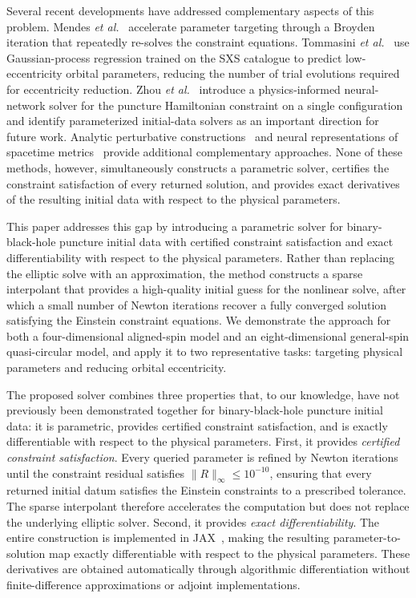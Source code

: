 \documentclass[
  aps,
  prd,
  twocolumn,
  amsmath,
  amssymb,
  nofootinbib,
  superscriptaddress,
  floatfix,
]{revtex4-2}
\begin{document}
Several recent developments have addressed complementary aspects of this problem.
Mendes \emph{et al.}~\cite{Mendes2025} accelerate parameter targeting through a Broyden iteration that repeatedly re-solves the constraint equations.
Tommasini \emph{et al.}~\cite{Tommasini2026} use Gaussian-process regression trained on the SXS catalogue to predict low-eccentricity orbital parameters, reducing the number of trial evolutions required for eccentricity reduction.
Zhou \emph{et al.}~\cite{Zhou2026} introduce a physics-informed neural-network solver for the puncture Hamiltonian constraint on a single configuration and identify parameterized initial-data solvers as an important direction for future work.
Analytic perturbative constructions~\cite{Ogurol2025} and neural representations of spacetime metrics~\cite{Cranganore2025} provide additional complementary approaches.
None of these methods, however, simultaneously constructs a parametric solver, certifies the constraint satisfaction of every returned solution, and provides exact derivatives of the resulting initial data with respect to the physical parameters.


This paper addresses this gap by introducing a parametric solver for binary-black-hole puncture initial data with certified constraint satisfaction and exact differentiability with respect to the physical parameters.
Rather than replacing the elliptic solve with an approximation, the method constructs a sparse interpolant that provides a high-quality initial guess for the nonlinear solve, after which a small number of Newton iterations recover a fully converged solution satisfying the Einstein constraint equations.
We demonstrate the approach for both a four-dimensional aligned-spin model and an eight-dimensional general-spin quasi-circular model, and apply it to two representative tasks: targeting physical parameters and reducing orbital eccentricity.


The proposed solver combines three properties that, to our knowledge, have not previously been demonstrated together for binary-black-hole puncture initial data: it is parametric, provides certified constraint satisfaction, and is exactly differentiable with respect to the physical parameters.
First, it provides \emph{certified constraint satisfaction}. Every queried parameter is refined by Newton iterations until the constraint residual satisfies $\|R\|_\infty \le 10^{-10}$, ensuring that every returned initial datum satisfies the Einstein constraints to a prescribed tolerance.
The sparse interpolant therefore accelerates the computation but does not replace the underlying elliptic solver.
Second, it provides \emph{exact differentiability}.
The entire construction is implemented in JAX~\cite{Jax2018}, making the resulting parameter-to-solution map exactly differentiable with respect to the physical parameters.
These derivatives are obtained automatically through algorithmic differentiation without finite-difference approximations or adjoint implementations.
\end{document}
